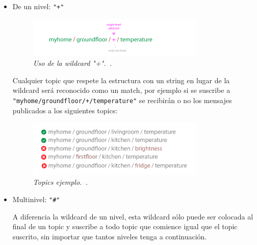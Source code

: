 \begin{itemize}

\item De un nivel: \lstinline[columns=fixed]{"+"}

\begin{figure}[h!]
  \centering
  \includegraphics[width=0.8\textwidth, keepaspectratio]{images/topic-wildcard-plus}
  \caption{\textit{Uso de la wildcard "+".~\cite{MQTTEssentials5}.}}
  \label{fig:topic-wildcard-plus}
\end{figure}

Cualquier topic que respete la estructura con un string en lugar de la wildcard será reconocido como un match, por ejemplo si se suscribe a \lstinline[columns=fixed]{"myhome/groundfloor/+/temperature"} se recibirán o no los mensajes publicados a los siguientes topics:

\begin{figure}[h!]
  \centering
  \includegraphics[width=0.8\textwidth, keepaspectratio]{images/topic-wildcard-plus-example}
  \caption{\textit{Topics ejemplo.~\cite{MQTTEssentials5}.}}
  \label{fig:topic-wildcard-plus-example}
\end{figure}

\item Multinivel: \lstinline[columns=fixed]{"#"}

A diferencia la wildcard de un nivel, esta wildcard sólo puede ser colocada al final de un topic y suscribe a todo topic que comience igual que el topic suscrito, sin importar que tantos niveles tenga a continuación.

\begin{figure}[h!]
  \centering


\end{figure}
\end{itemize}
